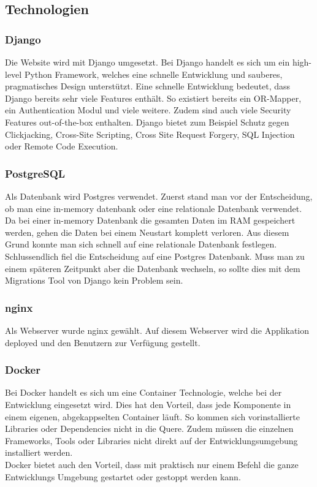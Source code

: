 \subsection{Technologien}
\subsubsection*{Django}
Die Website wird mit Django umgesetzt. Bei Django handelt es sich um ein high-level Python Framework, welches eine schnelle Entwicklung und sauberes, pragmatisches Design unterstützt. Eine schnelle Entwicklung bedeutet, dass Django bereits sehr viele Features enthält. So existiert bereits ein OR-Mapper, ein Authentication Modul und viele weitere. Zudem sind auch viele Security Features out-of-the-box enthalten. Django bietet zum Beispiel Schutz gegen Clickjacking, Cross-Site Scripting, Cross Site Request Forgery, SQL Injection oder Remote Code Execution.

\subsubsection*{PostgreSQL}
Als Datenbank wird Postgres verwendet. Zuerst stand man vor der Entscheidung, ob man eine in-memory datenbank oder eine relationale Datenbank verwendet. Da bei einer in-memory Datenbank die gesamten Daten im RAM gespeichert werden, gehen die Daten bei einem Neustart komplett verloren. Aus diesem Grund konnte man sich schnell auf eine relationale Datenbank festlegen. \\
Schlussendlich fiel die Entscheidung auf eine Postgres Datenbank. Muss man zu einem späteren Zeitpunkt aber die Datenbank wechseln, so sollte dies mit dem Migrations Tool von Django kein Problem sein.

\subsubsection*{nginx}
Als Webserver wurde nginx gewählt. Auf diesem Webserver wird die Applikation deployed und den Benutzern zur Verfügung gestellt. 

\subsubsection*{Docker}
Bei Docker handelt es sich um eine Container Technologie, welche bei der Entwicklung eingesetzt wird. Dies hat den Vorteil, dass jede Komponente in einem eigenen, abgekappselten Container läuft. So kommen sich vorinstallierte Libraries oder Dependencies nicht in die Quere. Zudem müssen die einzelnen Frameworks, Tools oder Libraries nicht direkt auf der Entwicklungsumgebung installiert werden. \\
Docker bietet auch den Vorteil, dass mit praktisch nur einem Befehl die ganze Entwicklungs Umgebung gestartet oder gestoppt werden kann.

